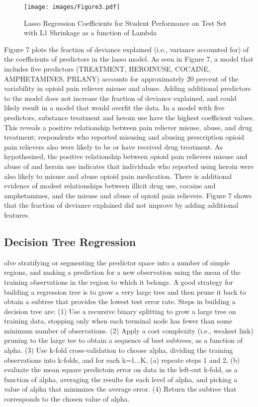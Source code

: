 \documentclass[sigconf]{acmart}
\begin{document}
\begin{figure}[!ht]
  \centering\texttt{[image: images/Figure3.pdf]}
  \caption{Lasso Regression Coefficients for Student Performance on Test Set 
  with L1 Shrinkage as a function of Lambda}
  \label{f:Figure3}
\end{figure}

Figure 7 plots the fraction of deviance explained (i.e., variance accounted 
for) of the coefficients of predictors in the lasso model. As seen in 
Figure 7, a model that includes five predictors (TREATMENT, HEROINUSE, 
COCAINE, AMPHETAMINES, PRLANY) accounts for approximately 20 percent of the 
variability in opioid pain reliever misuse and abuse. Adding additional 
predictors to the model does not increase the fraction of deviance explained, 
and could likely result in a model that would overfit the data. In a model 
with five predictors, substance treatment and heroin use have the highest 
coefficient values. This reveals a positive relationship between pain reliever 
misuse, abuse, and drug treatment; respondents who reported misusing and 
abusing prescription opioid pain relievers also were likely to be or have
received drug treatment. As hypothesized, the positive relationship between 
opioid pain relievers misuse and abuse of and heroin use indicates that
individuals who reported using heroin were also likely to misuse and abuse 
opioid pain medication. There is additional evidence of modest relationships 
between illicit drug use, cocaine and amphetamines, and the misuse and abuse 
of opioid pain relievers. Figure 7 shows that the fraction of deviance
explained did not improve by adding additional features.


\subsection{Decision Tree Regression}

olve stratifying or segmenting the
predictor space into a number of simple regions, and making a prediction for 
a new observation using the mean of the training observations in the region 
to which it belongs. A good strategy for building a regression tree is to
grow a very large tree and then prune it back to obtain a subtree that
provides the lowest test error rate. Steps in building a decision tree are:
(1) Use a recursive binary splitting to grow a large tree on training data, 
stopping only when each terminal node has fewer than some minimum number of 
observations. (2) Apply a cost complexity (i.e., weakest link) pruning  to 
the large tee to obtain a sequence of best subtrees, as a function of alpha. 
(3) Use k-fold cross-validation to choose alpha, dividing the training 
observations into k-folds, and for each k=1...K, (a) repeate steps 1 and 2,
(b) evaluate the mean square predictoin error on data in the left-out k-fold,
as a function of alpha, averaging the results for each level of alpha, and 
picking a value of alpha that minimizes the average error. (4) Return the 
subtree that corresponds to the chosen value of alpha. 
\end{document}
